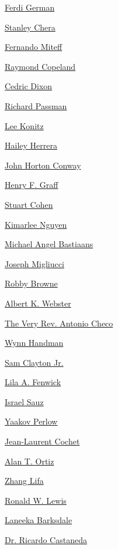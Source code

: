 \protect\hyperlink{ferdi-german}{Ferdi German}

\protect\hyperlink{stanley-chera}{Stanley Chera}

\protect\hyperlink{fernando-miteff}{Fernando Miteff}

\protect\hyperlink{raymond-copeland}{Raymond Copeland}

\protect\hyperlink{cedric-dixon}{Cedric Dixon}

\protect\hyperlink{richard-passman}{Richard Passman}

\protect\hyperlink{lee-konitz}{Lee Konitz}

\protect\hyperlink{hailey-herrera}{Hailey Herrera}

\protect\hyperlink{john-horton-conway}{John Horton Conway}

\protect\hyperlink{henry-f-graff}{Henry F. Graff}

\protect\hyperlink{stuart-cohen}{Stuart Cohen}

\protect\hyperlink{kimarlee-nguyen}{Kimarlee Nguyen}

\protect\hyperlink{michael-angel-bastiaans}{Michael Angel Bastiaans}

\protect\hyperlink{joseph-migliucci}{Joseph Migliucci}

\protect\hyperlink{robby-browne}{Robby Browne}

\protect\hyperlink{albert-k-webster}{Albert K. Webster}

\protect\hyperlink{the-very-rev-antonio-checo}{The Very Rev. Antonio
Checo}

\protect\hyperlink{wynn-handman}{Wynn Handman}

\protect\hyperlink{sam-clayton-jr-}{Sam Clayton Jr.}

\protect\hyperlink{lila-a-fenwick}{Lila A. Fenwick}

\protect\hyperlink{israel-sauz}{Israel Sauz}

\protect\hyperlink{yaakov-perlow}{Yaakov Perlow}

\protect\hyperlink{jeanlaurent-cochet}{Jean-Laurent Cochet}

\protect\hyperlink{alan-t-ortiz}{Alan T. Ortiz}

\protect\hyperlink{zhang-lifa}{Zhang Lifa}

\protect\hyperlink{ronald-w-lewis}{Ronald W. Lewis}

\protect\hyperlink{laneeka-barksdale}{Laneeka Barksdale}

\protect\hyperlink{dr-ricardo-castaneda}{Dr. Ricardo Castaneda}

